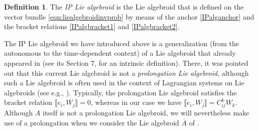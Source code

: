 \documentclass[11pt]{article}
\theoremstyle{plain}
\theoremstyle{definition}
\newtheorem{definition}{Definition}
\begin{document}
\begin{definition} \label{def:IPalgebroid}
The \emph{IP Lie algebroid} is the Lie algebroid that is defined on the vector bundle \eqref{eqn:liealgebroidinvprob} by means of the anchor \eqref{IPalganchor} and the bracket relations \eqref{IPalgbracket1} and \eqref{IPalgbracket2}.
\end{definition}



The  IP Lie algebroid we have introduced above is a generalization (from the autonomous to the time-dependent context) of a Lie algebroid that already appeared in \cite{crampin2008invariantinv} (see its Section 7, for an intrinsic definition). There, it was pointed out that this current Lie algebroid is not a \emph{prolongation Lie algebroid}, although such a Lie algebroid is often used in the context of Lagrangian systems on Lie algebroids (see e.g.,  \cite{martinez2001lagrangeliealgebroid}). Typically, the prolongation Lie algebroid satisfies the bracket relation $\llbracket e_i,W_j\rrbracket=0$, whereas in our case we have $\llbracket e_i,W_j\rrbracket=C_{ij}^k W_k$. Although $A$ itself is not a prolongation Lie algebroid, we will nevertheless make use of a prolongation when we consider the Lie algebroid $\overline A$ of .
\end{document}
